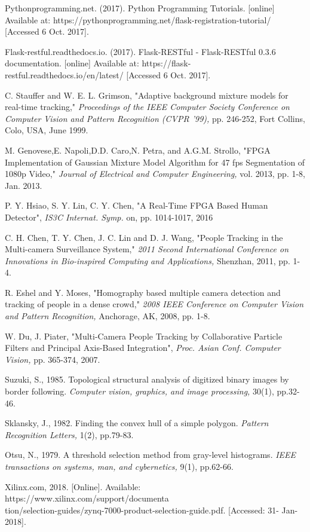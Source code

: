 \documentclass[12pt,a4paper]{report}
\begin{document}
\begin{thebibliography}{10}
Pythonprogramming.net. (2017). Python Programming Tutorials. [online] Available at: https://pythonprogramming.net/flask-registration-tutorial/ [Accessed 6 Oct. 2017].

Flask-restful.readthedocs.io. (2017). Flask-RESTful - Flask-RESTful 0.3.6 documentation. [online] Available at: https://flask-restful.readthedocs.io/en/latest/ [Accessed 6 Oct. 2017].

C. Stauffer and W. E. L. Grimson, "Adaptive background mixture models for real-time tracking," \textit{Proceedings of the IEEE Computer Society Conference on Computer Vision and Pattern Recognition (CVPR '99),} pp. 246-252, Fort Collins, Colo, USA, June 1999. 

M. Genovese,E. Napoli,D.D. Caro,N. Petra, and A.G.M. Strollo, "FPGA Implementation of Gaussian Mixture Model Algorithm for 47 fps Segmentation  of 1080p Video," \textit{Journal  of  Electrical  and  Computer Engineering,} vol. 2013, pp. 1-8, Jan. 2013. 

P. Y. Hsiao, S. Y. Lin, C. Y. Chen, "A Real-Time FPGA Based Human Detector", \textit{IS3C Internat. Symp.} on, pp. 1014-1017, 2016

C. H. Chen, T. Y. Chen, J. C. Lin and D. J. Wang, "People Tracking in the Multi-camera Surveillance System," \textit{2011 Second International Conference on Innovations in Bio-inspired Computing and Applications,} Shenzhan, 2011, pp. 1-4.

R. Eshel and Y. Moses, "Homography based multiple camera detection and tracking of people in a dense crowd," \textit{2008 IEEE Conference on Computer Vision and Pattern Recognition,} Anchorage, AK, 2008, pp. 1-8.

W. Du, J. Piater, "Multi-Camera People Tracking by Collaborative Particle Filters and Principal Axis-Based Integration", \textit{Proc. Asian Conf. Computer Vision,} pp. 365-374, 2007.

Suzuki, S., 1985. Topological structural analysis of digitized binary images by border following. \textit{Computer vision, graphics, and image processing,} 30(1), pp.32-46.

Sklansky, J., 1982. Finding the convex hull of a simple polygon. \textit{Pattern Recognition Letters,} 1(2), pp.79-83.

Otsu, N., 1979. A threshold selection method from gray-level histograms. \textit{IEEE transactions on systems, man, and cybernetics,} 9(1), pp.62-66.

Xilinx.com, 2018. [Online]. Available: https://www.xilinx.com/support/documenta\\tion/selection-guides/zynq-7000-product-selection-guide.pdf. [Accessed: 31- Jan- 2018].
\end{thebibliography}
\end{document}
